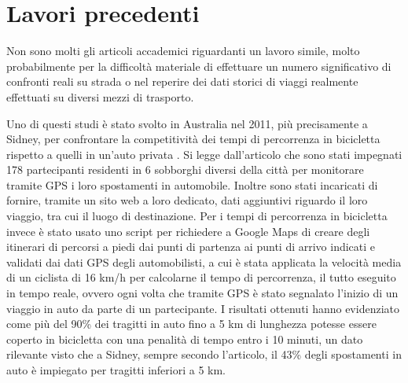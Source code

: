 \section{Lavori precedenti}
\label{lavoriprecedenti}

Non sono molti gli articoli accademici riguardanti un lavoro simile, molto probabilmente per la difficoltà materiale di effettuare un numero significativo di confronti reali su strada o nel reperire dei dati storici di viaggi realmente effettuati su diversi mezzi di trasporto.

Uno di questi studi è stato svolto in Australia nel 2011, più precisamente a Sidney, per confrontare la competitività dei tempi di percorrenza in bicicletta rispetto a quelli in un'auto privata \cite{ellison2011travel}. Si legge dall'articolo che sono stati impegnati 178 partecipanti residenti in 6 sobborghi diversi della città per monitorare tramite GPS i loro spostamenti in automobile. Inoltre sono stati incaricati di fornire, tramite un sito web a loro dedicato, dati aggiuntivi riguardo il loro viaggio, tra cui il luogo di destinazione. Per i tempi di percorrenza in bicicletta invece è stato usato uno script per richiedere a Google Maps di creare degli itinerari di percorsi a piedi dai punti di partenza ai punti di arrivo indicati e validati dai dati GPS degli automobilisti, a cui è stata applicata la velocità media di un ciclista di 16 km/h per calcolarne il tempo di percorrenza, il tutto eseguito in tempo reale, ovvero ogni volta che tramite GPS è stato segnalato l'inizio di un viaggio in auto da parte di un partecipante. I risultati ottenuti hanno evidenziato come più del 90\% dei tragitti in auto fino a 5 km di lunghezza potesse essere coperto in bicicletta con una penalità di tempo entro i 10 minuti, un dato rilevante visto che a Sidney, sempre secondo l'articolo, il 43\% degli spostamenti in auto è impiegato per tragitti inferiori a 5 km.


